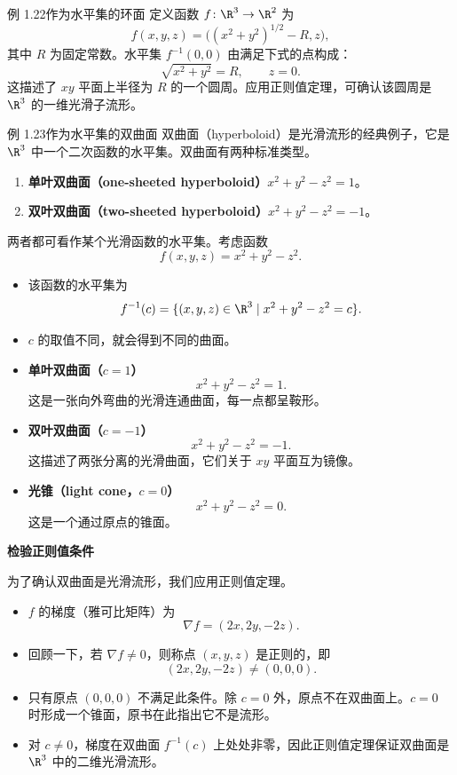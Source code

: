 \begin{statement}{例 1.22}{作为水平集的环面}
定义函数 $f\colon\R^3\to\R^2$ 为
\[
  f(x,y,z)=\bigl((x^2+y^2)^{1/2}-R,z\bigr),
\]
其中 $R$ 为固定常数。水平集 $f^{-1}(0,0)$ 由满足下式的点构成：
\[
  \sqrt{x^2+y^2}=R,\qquad z=0.
\]
这描述了 $xy$ 平面上半径为 $R$ 的一个圆周。应用正则值定理，可确认该圆周是 $\R^3$ 的一维光滑子流形。
\end{statement}

\begin{statement}{例 1.23}{作为水平集的双曲面}
双曲面（hyperboloid）是光滑流形的经典例子，它是 $\R^3$ 中一个二次函数的水平集。双曲面有两种标准类型。
\begin{enumerate}
  \item \textbf{单叶双曲面（one-sheeted hyperboloid）}\quad $x^2+y^2-z^2=1$。
  \item \textbf{双叶双曲面（two-sheeted hyperboloid）}\quad $x^2+y^2-z^2=-1$。
\end{enumerate}
两者都可看作某个光滑函数的水平集。考虑函数
\[
  f(x,y,z)=x^2+y^2-z^2.
\]
\begin{itemize}
  \item 该函数的水平集为
  \[
    f^{-1}(c)=\{(x,y,z)\in\R^3\mid x^2+y^2-z^2=c\}.
  \]
  \item $c$ 的取值不同，就会得到不同的曲面。
  \item \textbf{单叶双曲面（$c=1$）}
  \[
    x^2+y^2-z^2=1.
  \]
  这是一张向外弯曲的光滑连通曲面，每一点都呈鞍形。
  \item \textbf{双叶双曲面（$c=-1$）}
  \[
    x^2+y^2-z^2=-1.
  \]
  这描述了两张分离的光滑曲面，它们关于 $xy$ 平面互为镜像。
  \item \textbf{光锥（light cone，$c=0$）}
  \[
    x^2+y^2-z^2=0.
  \]
  这是一个通过原点的锥面。
\end{itemize}

\textbf{检验正则值条件}\par
为了确认双曲面是光滑流形，我们应用正则值定理。
\begin{itemize}
  \item $f$ 的梯度（雅可比矩阵）为
  \[
    \nabla f=(2x,2y,-2z).
  \]
  \item 回顾一下，若 $\nabla f\ne0$，则称点 $(x,y,z)$ 是正则的，即
  \[
    (2x,2y,-2z)\ne(0,0,0).
  \]
  \item 只有原点 $(0,0,0)$ 不满足此条件。除 $c=0$ 外，原点不在双曲面上。$c=0$ 时形成一个锥面，原书在此指出它不是流形。
  \item 对 $c\ne0$，梯度在双曲面 $f^{-1}(c)$ 上处处非零，因此正则值定理保证双曲面是 $\R^3$ 中的二维光滑流形。
\end{itemize}
\end{statement}

